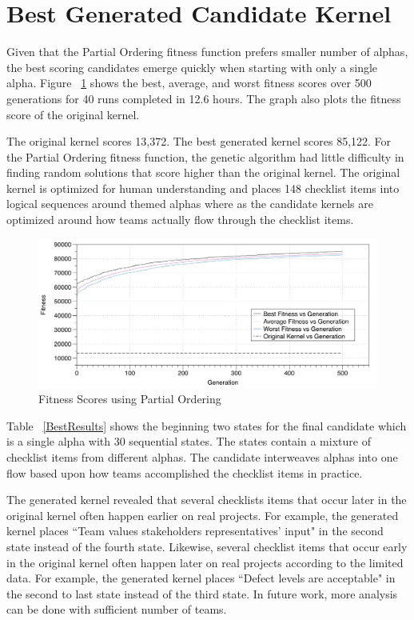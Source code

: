 \documentclass[3p,times,procedia]{elsarticle}
\begin{document}
\section{Best Generated Candidate Kernel}

Given that the Partial Ordering fitness function prefers smaller number of alphas, the best scoring candidates emerge quickly when starting with only a single alpha. Figure ~\ref{BestResultsPartialOrdering} shows the best, average, and worst fitness scores over 500 generations for 40 runs completed in 12.6 hours. The graph also plots the fitness score of the original kernel.

The original kernel scores 13,372. The best generated kernel scores 85,122. For the Partial Ordering fitness function, the genetic algorithm had little difficulty in finding random solutions that score higher than the original kernel. The original kernel is optimized for human understanding and places 148 checklist items into logical sequences around themed alphas where as the candidate kernels are optimized around how teams actually flow through the checklist items.

\begin{figure}[ht]\vspace*{4pt}
\centerline{\includegraphics[width=6.25in]{images/best_results_partial_ordering_500gens_40runs}}
\caption{Fitness Scores using Partial Ordering}\vspace*{-6pt}
\label{BestResultsPartialOrdering}
\end{figure}

Table ~\ref{BestResults} shows the beginning two states for the final candidate which is a single alpha with 30 sequential states. The states contain a mixture of checklist items from different alphas. The candidate interweaves alphas into one flow based upon how teams accomplished the checklist items in practice. 

The generated kernel revealed that several checklists items that occur later in the original kernel often happen earlier on real projects. For example, the generated kernel places ``Team values stakeholders representatives' input" in the second state instead of the fourth state. Likewise, several checklist items that occur early in the original kernel often happen later on real projects according to the limited data. For example, the generated kernel places ``Defect levels are acceptable" in the second to last state instead of the third state. In future work, more analysis can be done with sufficient number of teams.
\end{document}
